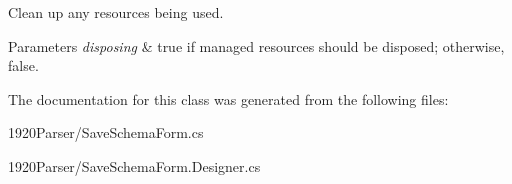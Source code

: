 Clean up any resources being used. 


\begin{DoxyParams}{Parameters}
{\em disposing} & true if managed resources should be disposed; otherwise, false.\\
\hline
\end{DoxyParams}


The documentation for this class was generated from the following files\+:\begin{DoxyCompactItemize}
\item 
1920\+Parser/Save\+Schema\+Form.\+cs\item 
1920\+Parser/Save\+Schema\+Form.\+Designer.\+cs\end{DoxyCompactItemize}
